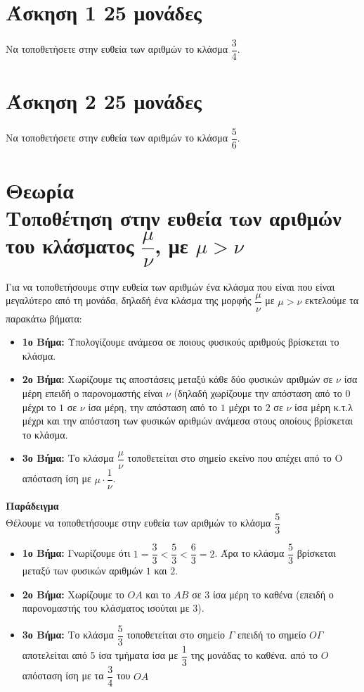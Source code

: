 \documentclass[a4paper,10pt]{report}
\begin{document}
\section*{Άσκηση 1  \hfill \small{25 μονάδες}}
Να τοποθετήσετε στην ευθεία των αριθμών το κλάσμα $\dfrac{3}{4}$.

\section*{Άσκηση 2  \hfill \small{25 μονάδες}}
Να τοποθετήσετε στην ευθεία των αριθμών το κλάσμα $\dfrac{5}{6}$.


\section*{Θεωρία\\Τοποθέτηση στην ευθεία των αριθμών του κλάσματος $\dfrac{μ}{ν}$, με $μ>ν$ \hfill \small{}}
Για να τοποθετήσουμε στην ευθεία των αριθμών ένα κλάσμα που είναι που είναι μεγαλύτερο από τη μονάδα, δηλαδή 
ένα κλάσμα της μορφής $\dfrac{μ}{ν}$ με $μ>ν$ εκτελούμε τα παρακάτω βήματα:
\begin{itemize}
 \item \textbf{1ο Βήμα:} Υπολογίζουμε ανάμεσα σε ποιους φυσικούς αριθμούς βρίσκεται το κλάσμα.
 \item \textbf{2ο Βήμα:} Χωρίζουμε τις αποστάσεις μεταξύ κάθε δύο φυσικών αριθμών 
              σε $ν$ ίσα μέρη επειδή ο παρονομαστής είναι $ν$ (δηλαδή χωρίζουμε την απόσταση 
              από το $0$ μέχρι το $1$ σε $ν$ ίσα μέρη, την απόσταση 
              από το $1$ μέχρι το $2$ σε $ν$ ίσα μέρη κ.τ.λ μέχρι και την απόσταση των φυσικών αριθμών 
              ανάμεσα στους οποίους βρίσκεται το κλάσμα.
 \item \textbf{3ο Βήμα:} Το κλάσμα $\dfrac{μ}{ν}$ τοποθετείται στο σημείο εκείνο που απέχει 
               από το Ο απόσταση ίση με $μ\cdot \dfrac{1}{ν}$. 
\end{itemize}

\textbf{Παράδειγμα} \\
Θέλουμε να τοποθετήσουμε στην ευθεία των αριθμών το κλάσμα $\dfrac{5}{3}$
\begin{itemize}
\item \textbf{1ο Βήμα:} Γνωρίζουμε ότι $1=\dfrac{3}{3}<\dfrac{5}{3}<\dfrac{6}{3}=2$.
      Άρα  το κλάσμα $\dfrac{5}{3}$ βρίσκεται 
      μεταξύ των φυσικών αριθμών $1$ και $2$.
 \item \textbf{2ο Βήμα:} Χωρίζουμε το $ΟΑ$ και το $ΑΒ$ σε 3 ίσα μέρη το καθένα 
 (επειδή ο παρονομαστής του κλάσματος ισούται με 3).
 \item \textbf{3ο Βήμα:} Το κλάσμα $\dfrac{5}{3}$ τοποθετείται στο σημείο $Γ$ επειδή το σημείο $ΟΓ$ αποτελείται 
        από 5 ίσα τμήματα ίσα με $\dfrac{1}{3}$ της μονάδας το καθένα.
       από το $Ο$ απόσταση ίση με τα $\dfrac{3}{4}$ του $ΟΑ$ 
\end{itemize}
\end{document}
